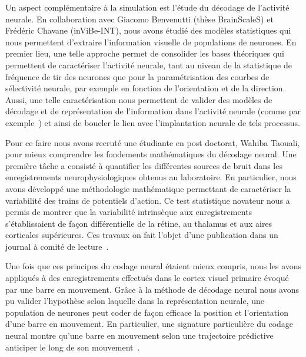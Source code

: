 \documentclass[11pt,french,a4paper,oneside]{article}%
\begin{document}
Un aspect complémentaire à la simulation est l'étude du décodage de l'activité neurale. En collaboration avec Giacomo Benvenutti (thèse BrainScaleS) et Frédéric Chavane (inViBe-INT), nous avons étudié des modèles statistiques qui nous permettent d'extraire l'information visuelle de populations de neurones. En premier lieu, une telle approche permet de consolider les bases théoriques qui permettent de caractériser l'activité neurale, tant au niveau de la statistique de fréquence de tir des neurones que pour la paramétrisation des courbes de sélectivité neurale, par exemple en fonction de l'orientation et de la direction. Aussi, une telle caractérisation nous permettent de valider des modèles de décodage et de représentation de l'information dans l'activité neurale (comme par exemple~\citep{Jazayeri06}) et ainsi de boucler le lien avec l'implantation neurale de tels processus. %

Pour ce faire nous avons recruté une étudiante en post doctorat, Wahiba Taouali, pour mieux comprendre les fondements mathématiques du décodage neural. Une première tâche a consisté à quantifier les différentes sources de bruit dans les enregistrements neurophysiologiques obtenus au laboratoire. En particulier, nous avons développé une méthodologie mathématique permettant de caractériser la variabilité des trains de potentiels d'action. Ce test statistique novateur nous a permis de montrer que la variabilité intrinsèque aux enregistrements s'établissaient de façon différentielle de la rétine, au thalamus et aux aires corticales supérieures. Ces travaux on fait l'objet d'une publication dans un journal à comité de lecture~\citep{Taouali16}. 

Une fois que ces principes du codage neural étaient mieux compris, nous les avons appliqués à des enregistrements effectués dans le cortex visuel primaire  évoqué par une barre en mouvement. Grâce à la méthode de décodage neural nous avons pu valider l'hypothèse selon laquelle dans la représentation neurale, une population de neurones peut coder de façon efficace la position et l'orientation d'une barre en mouvement. En particulier, une signature particulière du codage neural montre qu'une barre en mouvement selon une trajectoire prédictive anticiper le long de son mouvement~\citep{Taouali15vss,Taouali16areadne,Perrinet19nccd}. %
 
\end{document}
